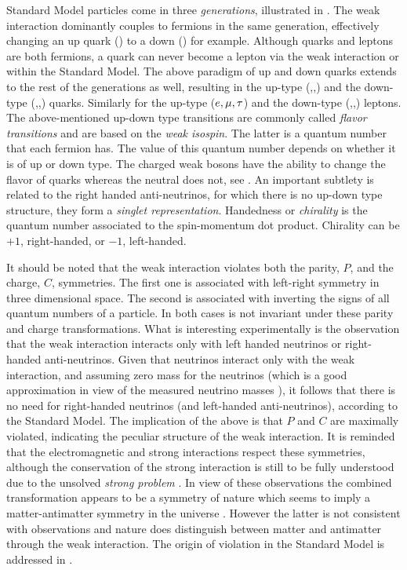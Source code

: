 Standard Model particles come in three {\it generations}, illustrated in .
The weak interaction dominantly couples to fermions in the same generation, effectively changing an up quark (\uquark) to a down (\dquark) for example.
Although quarks and leptons are both fermions, a quark can never become a lepton via the weak interaction or \viceversa within the Standard Model.
The above paradigm of up and down quarks extends to the rest of the generations as well, resulting in the up-type (\uquark,\cquark,\tquark)
and the down-type (\dquark,\squark,\bquark) quarks. Similarly for the  up-type ($e,\mu,\tau$) and the down-type (\neue,\neum,\neut)
leptons. The above-mentioned up-down type transitions are commonly called {\it flavor transitions} and are based on the
{\it weak isospin}. The latter is a quantum number that each fermion has. The value of this quantum number depends on whether it is of up or down type.
The charged weak bosons \Wpm have the ability to change the flavor of quarks whereas the neutral \Z does not, see .
An important subtlety is related to the right handed anti-neutrinos, for which there is no up-down type structure,
\ie they form a  {\it singlet representation}. Handedness or {\it chirality} is the quantum number associated to the
spin-momentum dot product. Chirality can be $+1$, right-handed, or $-1$, left-handed.

It should be noted that the weak interaction violates both the parity, $P$, and the charge, $C$, symmetries.
The first one is associated with left-right symmetry in three dimensional space.
The second is associated with inverting the signs of all quantum numbers of a particle.
In both cases  is not invariant under these parity and charge transformations.
What is interesting experimentally is the observation \cite{wu-parity,garwin-parity} that the weak interaction interacts
only with left handed neutrinos or right-handed anti-neutrinos. Given that neutrinos interact only with the weak interaction,
and assuming zero mass for the neutrinos (which is a good approximation in view of the measured neutrino masses \cite{nu-mass-superkam,nu-mass-kamland,nu-mass-sno,nu-mass-daya}),
it follows that there is no need for right-handed neutrinos (and left-handed anti-neutrinos), according to the Standard Model.
The implication of the above is that $P$ and $C$ are maximally violated, indicating the
peculiar structure of the weak interaction. It is reminded that the electromagnetic and
strong interactions respect these symmetries, although the \CP conservation of the strong interaction is still to be fully
understood due to the unsolved {\it strong \CP problem} \cite{Peccei:2006as}.
In view of these observations the combined \CP transformation appears to be
a symmetry of nature which seems to imply a matter-antimatter symmetry in the universe \cite{Sakharov:1967dj}.
However the latter is not consistent with observations and nature does distinguish between matter and antimatter
through the weak interaction. The origin of \CP violation in the Standard Model is addressed in .

